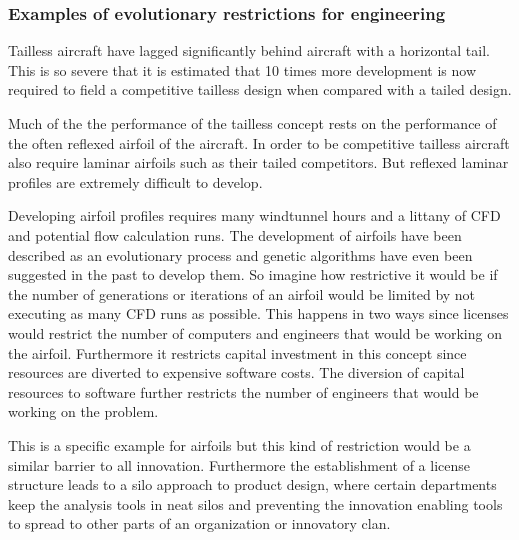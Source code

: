 \documentclass{beamer}
\begin{document}

\begin{frame}
\frametitle{Examples of evolutionary restrictions for engineering}

Tailless aircraft have lagged significantly behind aircraft with a horizontal tail.  This is so severe that it is estimated that 10 times more development is now required to field a competitive tailless design when compared with a tailed design.

Much of the the performance of the tailless concept rests on the performance of the often reflexed airfoil of the aircraft.  In order to be competitive tailless aircraft also require laminar airfoils such as their tailed competitors.  But reflexed laminar profiles are extremely difficult to develop.  

Developing airfoil profiles requires many windtunnel hours and a littany of CFD and potential flow calculation runs.  The development of airfoils have been described as an evolutionary process and genetic algorithms have even been suggested in the past to develop them.
So imagine how restrictive it would be if the number of generations or iterations of an airfoil would be limited by not executing as many CFD runs as possible.
This happens in two ways since licenses would restrict the number of computers and engineers that would be working on the airfoil.  Furthermore it restricts capital investment in this concept since resources are diverted to expensive software costs.  
The diversion of capital resources to software further restricts the number of engineers that would be working on the problem.

This is a specific example for airfoils but this kind of restriction would be a similar barrier to all innovation.  
Furthermore the establishment of a license structure leads to a silo approach to product design, where certain departments keep the analysis tools in neat silos and preventing the innovation enabling tools to spread to other parts of an organization or innovatory clan.

\end{frame}

\end{document}
